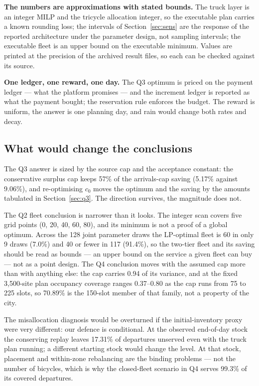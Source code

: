 \textbf{The numbers are approximations with stated bounds.} The truck layer is an
integer MILP and the tricycle allocation integer, so the executable plan carries a
known rounding loss; the intervals of Section~\ref{sec:sens} are the response of
the reported architecture under the parameter design, not sampling intervals; the
executable fleet is an upper bound on the executable minimum. Values are printed at the
precision of the archived result files, so each can be checked against its source.

\textbf{One ledger, one reward, one day.} The Q3 optimum is priced on the payment
ledger --- what the platform promises --- and the increment ledger is reported as what
the payment bought; the reservation rule enforces the budget. The reward is uniform, the
answer is one planning day, and rain would change both rates and decay.

\subsection{What would change the conclusions}

The Q3 answer is sized by the source cap and the acceptance constant: the conservative
surplus cap keeps 57\% of the arrivals-cap saving (5.17\% against 9.06\%), and
re-optimising $c_0$ moves the optimum and the saving by the amounts tabulated in
Section~\ref{sec:q3}. The direction survives, the magnitude does not.

The Q2 fleet conclusion is narrower than it looks. The integer scan covers five grid
points (0, 20, 40, 60, 80), and its minimum is not a proof of a global optimum. Across
the 128 joint parameter draws the LP-optimal fleet is 60 in only 9 draws (7.0\%) and
40 or fewer in 117 (91.4\%), so the two-tier fleet and its saving should be read as
bounds --- an upper bound on the service a given fleet can buy --- not as a point
design. The Q4 conclusion moves with the assumed cap more than with anything else: the
cap carries 0.94 of its variance, and at the fixed 3,500-site plan occupancy coverage
ranges 0.37--0.80 as the cap runs from 75 to 225 slots, so 70.89\% is the 150-slot member
of that family, not a property of the city.

The misallocation diagnosis would be overturned if the initial-inventory proxy
were very different: our defence is conditional. At the observed end-of-day stock the
conserving replay leaves 17.31\% of departures unserved even with the truck plan
running; a different starting stock would change the level. At that stock, placement
and within-zone rebalancing are the binding problems --- not the number of bicycles,
which is why the closed-fleet scenario in Q4 serves 99.3\% of its covered departures.

